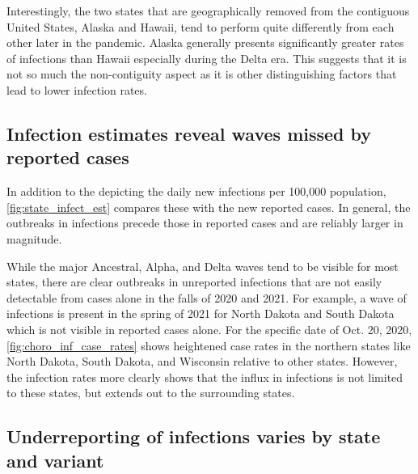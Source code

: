 \documentclass{article}
\begin{document}
Interestingly, the two states that are geographically removed from the
contiguous United States, Alaska and Hawaii, tend to perform quite differently
from each other later in the pandemic. Alaska generally presents significantly
greater rates of infections than Hawaii especially during the Delta era. This
suggests that it is not so much the non-contiguity aspect as it is other
distinguishing factors that lead to lower infection rates.

\subsection{Infection estimates reveal waves missed by reported cases}
\label{sec:omitted-waves}

In addition to the depicting the daily new infections per 100,000 population, \autoref{fig:state_infect_est}
compares these with the new reported cases. In general, the outbreaks in infections precede 
those in reported cases and are reliably larger in magnitude.

While the major Ancestral, Alpha, and Delta waves tend to be visible for most
states, there are clear outbreaks in unreported infections that are not easily
detectable from cases alone in the falls of 2020 and 2021. For example, a wave 
of infections is present in the spring of 2021 for North Dakota and South Dakota
which is not visible in reported cases alone.
For the specific date of Oct. 20, 2020, \autoref{fig:choro_inf_case_rates} shows 
heightened case rates in the northern states like North Dakota, South Dakota, and Wisconsin relative to other states.
However, the infection rates more clearly shows that the influx in infections is not limited to these states, 
but extends out to the surrounding states.

\subsection{Underreporting of infections varies by state and variant}
\label{sec:case-infection-ratio}
\end{document}

